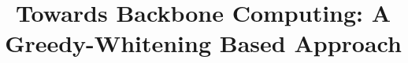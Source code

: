 \documentclass[letterpaper]{article}
\begin{document}
%
\title{Towards Backbone Computing: A Greedy-Whitening Based Approach}



\maketitle

\end{document}
